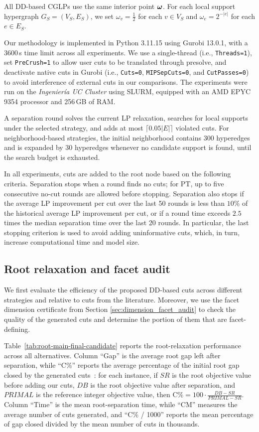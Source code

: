 All DD-based CGLPs use the same interior point $\bm{\omega}$.
For each local support hypergraph $G_S=(V_S,E_S)$, we set
$
\omega_v=\frac{1}{2}
$
for each $v\in V_S$ and
$
\omega_e=2^{-|e|}
$
for each $e\in E_S$.

Our methodology is implemented in Python 3.11.15 using Gurobi 13.0.1, with a 3600\,s time limit across all experiments. We use a single-thread (i.e., \texttt{Threads=1}), set \texttt{PreCrush=1} to allow user cuts to be translated through presolve, and deactivate native cuts in Gurobi (i.e., \texttt{Cuts=0}, \texttt{MIPSepCuts=0}, and \texttt{CutPasses=0}) to avoid interference of external cuts in our comparisons. The experiments were run on the \textit{Ingeniería UC Cluster} using SLURM, equipped with an AMD EPYC 9354 processor and 256\,GB of RAM.

A separation round solves the current LP relaxation, searches for local supports under
the selected strategy, and adds at most $\lceil 0.05|E|\rceil$ violated cuts. For
neighborhood-based strategies, the initial neighborhood contains 300 hyperedges and is
expanded by 30 hyperedges whenever no candidate support is found, until the search budget is exhausted.

In all experiments, cuts are added to the root node based on the following criteria. Separation stops when a round finds no cuts; for PT, up to five consecutive no-cut rounds are allowed before stopping. Separation also stops if the average LP improvement per cut over the last 50 rounds is less than $10\%$ of the historical average LP improvement per cut, or if a round time exceeds $2.5$ times the median separation time over the last 20 rounds. In particular, the last stopping criterion is used to avoid adding uninformative cuts, which, in turn, increase computational time and model size.  

\subsection{Root relaxation and facet audit}

We first evaluate the efficiency of the proposed DD-based cuts across different strategies and relative to cuts from the literature. Moreover, we use the facet dimension certificate from Section \ref{sec:dimension_facet_audit} to check the quality of the generated cuts and determine the portion of them that are facet-defining. 

Table~\ref{tab:root-main-final-candidate} reports the root-relaxation performance across all alternatives. Column ``Gap'' is the average root gap left after separation, while ``C\%'' reports the average percentage of the initial root gap closed by the
generated cuts~\cite{delPiaWalter2024simple}: for each instance, if $SR$
is the root objective value before adding our cuts, $DB$ is the root objective value
after separation, and $PRIMAL$ is the reference integer objective value, then
$ \mathrm{C\%} = 100\cdot \frac{DB-SR}{PRIMAL-SR}$.
Column ``Time'' is the mean root-separation time, while ``CM'' measures the average number of cuts generated, and ``C\% / 1000'' reports the mean percentage of gap closed divided by the mean number of cuts in thousands. 


